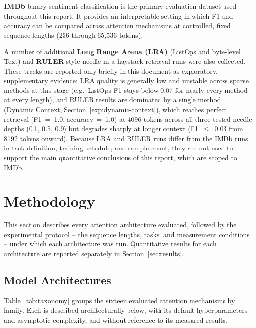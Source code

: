 \documentclass[11pt]{article}
\begin{document}
\textbf{IMDb} binary sentiment classification is the primary evaluation
dataset used throughout this report. It provides an interpretable setting in
which F1 and accuracy can be compared across attention mechanisms at
controlled, fixed sequence lengths (256 through 65{,}536 tokens).

A number of additional \textbf{Long Range Arena (LRA)} (ListOps and byte-level
Text) and \textbf{RULER}-style needle-in-a-haystack retrieval runs were also
collected. These tracks are reported only briefly in this document as
exploratory, supplementary evidence: LRA quality is generally low and unstable
across sparse methods at this stage (e.g.\ ListOps F1 stays below 0.07 for
nearly every method at every length), and RULER results are dominated by a
single method (Dynamic Context, Section~\ref{exp:dynamic-context}), which
reaches perfect retrieval (F1~=~1.0, accuracy~=~1.0) at 4096 tokens across all
three tested needle depths (0.1, 0.5, 0.9) but degrades sharply at longer
context (F1~$\leq$~0.03 from 8192 tokens onward). Because LRA and RULER runs
differ from the IMDb runs in task definition, training schedule, and sample
count, they are not used to support the main quantitative conclusions of this
report, which are scoped to IMDb.

\section{Methodology}
\label{sec:methodology}

This section describes every attention architecture evaluated, followed by
the experimental protocol -- the sequence lengths, tasks, and measurement
conditions -- under which each architecture was run. Quantitative results for
each architecture are reported separately in Section~\ref{sec:results}.

\subsection{Model Architectures}
\label{sec:architectures}

Table~\ref{tab:taxonomy} groups the sixteen evaluated attention mechanisms by
family. Each is described architecturally below, with its default
hyperparameters and asymptotic complexity, and without reference to its
measured results.
\end{document}
